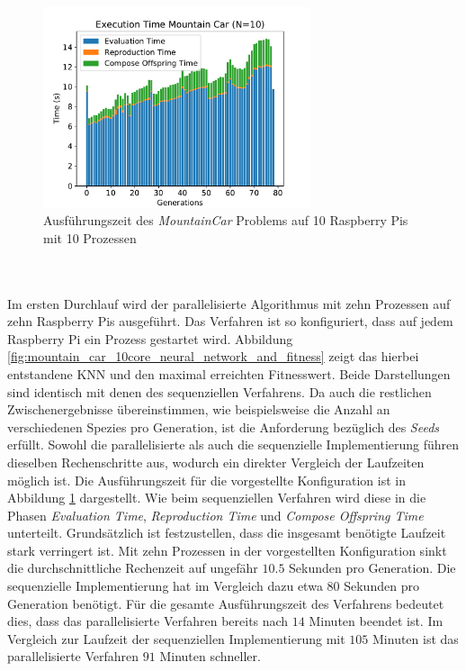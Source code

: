\begin{figure}[!h]
	\centering
	\includegraphics[width=0.7\textwidth]{./img/mountain_car_analysis/1413_time_10cores_10pis.pdf} 
	\caption{Ausführungszeit des \emph{MountainCar} Problems auf 10 Raspberry Pis mit 10 Prozessen}
	\label{fig:mountain_car_time_10cores_10pi}
\end{figure}
\\\\
Im ersten Durchlauf wird der parallelisierte Algorithmus mit zehn Prozessen auf zehn Raspberry Pis ausgeführt. Das Verfahren ist so konfiguriert, dass auf jedem Raspberry Pi ein Prozess gestartet wird. Abbildung \ref{fig:mountain_car_10core_neural_network_and_fitness} zeigt das hierbei entstandene \ac{KNN} und den maximal erreichten Fitnesswert. Beide Darstellungen sind identisch mit denen des sequenziellen Verfahrens. Da auch die restlichen Zwischenergebnisse übereinstimmen, wie beispielsweise die Anzahl an verschiedenen Spezies pro Generation, ist die Anforderung bezüglich des \emph{Seeds} erfüllt. Sowohl die parallelisierte als auch die sequenzielle Implementierung führen dieselben Rechenschritte aus, wodurch ein direkter Vergleich der Laufzeiten möglich ist. Die Ausführungszeit für die vorgestellte Konfiguration ist in Abbildung  \ref{fig:mountain_car_time_10cores_10pi} dargestellt. Wie beim sequenziellen Verfahren wird diese in die Phasen \emph{Evaluation Time}, \emph{Reproduction Time} und \emph{Compose Offspring Time} unterteilt. Grundsätzlich ist festzustellen, dass die insgesamt benötigte Laufzeit stark verringert ist. Mit zehn Prozessen in der vorgestellten Konfiguration sinkt die durchschnittliche Rechenzeit auf ungefähr $10.5$ Sekunden pro Generation. Die sequenzielle Implementierung hat im Vergleich dazu etwa $80$ Sekunden pro Generation benötigt. Für die gesamte Ausführungszeit des Verfahrens bedeutet dies, dass das parallelisierte Verfahren bereits nach $14$ Minuten beendet ist. Im Vergleich zur Laufzeit der sequenziellen Implementierung mit $105$ Minuten ist das parallelisierte Verfahren $91$ Minuten schneller.
